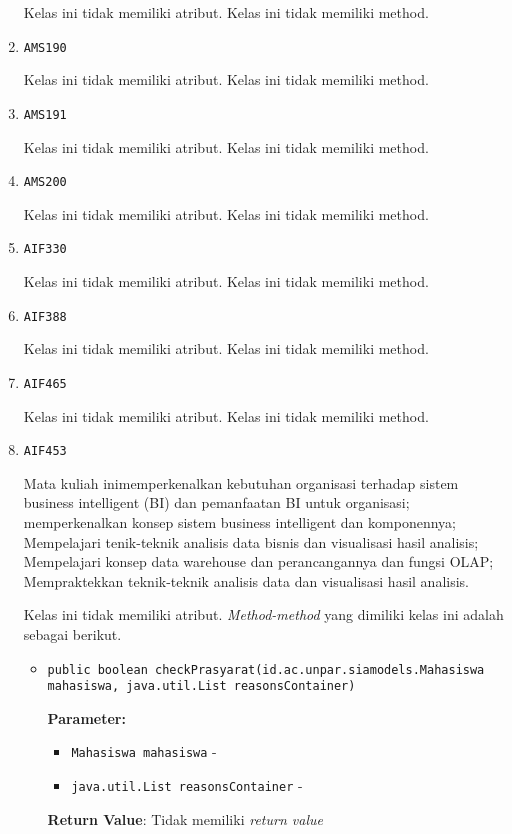\documentclass{article}
\begin{document}
\begin{enumerate}
Kelas ini tidak memiliki atribut. Kelas ini tidak memiliki method. \item \texttt{AMS190}



Kelas ini tidak memiliki atribut. Kelas ini tidak memiliki method. \item \texttt{AMS191}



Kelas ini tidak memiliki atribut. Kelas ini tidak memiliki method. \item \texttt{AMS200}



Kelas ini tidak memiliki atribut. Kelas ini tidak memiliki method. \item \texttt{AIF330}



Kelas ini tidak memiliki atribut. Kelas ini tidak memiliki method. \item \texttt{AIF388}



Kelas ini tidak memiliki atribut. Kelas ini tidak memiliki method. \item \texttt{AIF465}



Kelas ini tidak memiliki atribut. Kelas ini tidak memiliki method. \item \texttt{AIF453}

Mata kuliah inimemperkenalkan kebutuhan organisasi terhadap sistem business
 intelligent (BI) dan pemanfaatan BI untuk organisasi; memperkenalkan konsep
 sistem business intelligent dan komponennya; Mempelajari tenik-teknik
 analisis data bisnis dan visualisasi hasil analisis; Mempelajari konsep data
 warehouse dan perancangannya dan fungsi OLAP; Mempraktekkan teknik-teknik
 analisis data dan visualisasi hasil analisis.

Kelas ini tidak memiliki atribut. \textit{Method-method} yang dimiliki kelas ini adalah sebagai berikut.
\begin{itemize}
\item \texttt{public boolean checkPrasyarat(id.ac.unpar.siamodels.Mahasiswa mahasiswa, java.util.List reasonsContainer)}

\textbf{Parameter:}
\begin{itemize}
\item \texttt{Mahasiswa mahasiswa} - 
\item \texttt{java.util.List reasonsContainer} - 
\end{itemize}
\textbf{Return Value}: Tidak memiliki \textit{return value}


\end{itemize}
\end{enumerate}
\end{document}
